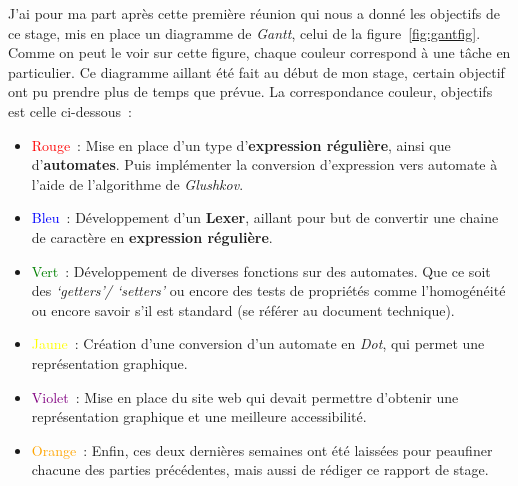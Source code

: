 \vphantom{}

J'ai pour ma part après cette première réunion qui nous a donné les objectifs
de ce stage, mis en place un diagramme de \textit{Gantt}, celui de la 
figure~\ref{fig:gantfig}. Comme on peut le voir sur cette figure, chaque couleur 
correspond à une tâche en particulier. Ce diagramme aillant été fait au début 
de mon stage, certain objectif ont pu prendre plus de temps que prévue. La 
correspondance couleur, objectifs est celle ci-dessous~:

\vphantom{}

\begin{itemize}
  \item[\textbullet] \textcolor{red}{Rouge}~: Mise en place d'un type 
  d'\textbf{expression régulière}, ainsi que d'\textbf{automates}. Puis 
  implémenter la conversion d'expression vers automate à l'aide de l'algorithme 
  de \textit{Glushkov}.
  \item[\textbullet] \textcolor{blue}{Bleu}~: Développement d'un \textbf{Lexer}, 
  aillant pour but de convertir une chaine de caractère en \textbf{expression 
  régulière}.
  \item[\textbullet] \textcolor{green}{Vert}~: Développement de diverses 
  fonctions sur des automates. Que ce soit des \textit{`getters'/ `setters'} ou 
  encore des tests de propriétés comme l'homogénéité ou encore savoir s'il 
  est standard (se référer au document technique).
  \item[\textbullet] \textcolor{yellow}{Jaune}~: Création d'une conversion d'un
  automate en \textit{Dot}, qui permet une représentation graphique.
  \item[\textbullet] \textcolor{purple}{Violet}~: Mise en place du site web qui 
  devait permettre d'obtenir une représentation graphique et une meilleure 
  accessibilité.
  \item[\textbullet] \textcolor{orange}{Orange}~: Enfin, ces deux dernières 
  semaines ont été laissées pour peaufiner chacune des parties précédentes, mais 
  aussi de rédiger ce rapport de stage.
\end{itemize}

